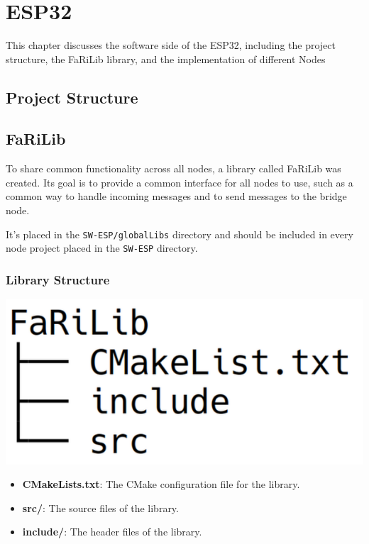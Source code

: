 \chapter{ESP32}
This chapter discusses the software side of the ESP32,
including the project structure, the FaRiLib library, and the
implementation of different Nodes

\section{Project Structure}

\section{FaRiLib}
To share common functionality across all nodes, a library called FaRiLib was
created. Its goal is to provide a common interface for all nodes to use, such as
a common way to handle incoming messages and to send messages to the bridge node. 
\par\vspace{0.5em}
It's placed in the \texttt{SW-ESP/globalLibs} directory and should be included in
every node project placed in the \texttt{SW-ESP} directory.
    \subsection{Library Structure}
        \begin{minipage}{0.48\textwidth}
            \includegraphics[width=0.8\linewidth]{assets/FaRiLibStructure.png}
            \label{fig:farilib_structure}
        \end{minipage}%
        \begin{minipage}{0.48\textwidth}
            \raggedright
            \begin{itemize}
                \item \textbf{CMakeLists.txt}: The CMake configuration file for the 
                library.
                \item \textbf{src/}: The source files of the library.
                \item \textbf{include/}: The header files of the library.
            \end{itemize}
        \end{minipage}
